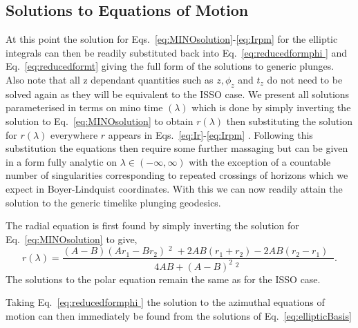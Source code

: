 \documentclass[12pt, amsmath]{revtex4-2}
\newcommand\lam{\lambda}
\DeclareMathOperator{\snr}{sin(\xi_r)}
\DeclareMathOperator{\cnr}{cos(\xi_r)}
\begin{document}
\subsection{Solutions to Equations of Motion}
At this point the solution for Eqs.~\eqref{eq:MINOsolution}-\eqref{eq:Irpm} for the elliptic integrals can then be readily substituted back into Eq.~\eqref{eq:reducedformphi } and  Eq.~\eqref{eq:reducedformt} giving the full form of the solutions to generic plunges. Also note that all z dependant quantities such as $z, \phi_z$ and $t_z$ do not need to be solved again as they will be equivalent to the ISSO case. We present all solutions parameterised in terms on mino time $(\lam)$ which is done by simply inverting the solution to Eq.~\eqref{eq:MINOsolution} to obtain $r(\lam)$ then substituting the solution for $r(\lam)$ everywhere $r$ appears in  Eqs.~\eqref{eq:Ir}-\eqref{eq:Irpm} . Following this substitution the equations then require some further massaging but can be given in a form fully analytic on $\lam \in (-\infty,\infty)$ with the exception of a countable number of singularities corresponding to repeated crossings of horizons which we expect in Boyer-Lindquist coordinates. With this we can now readily attain the solution to the generic timelike plunging geodesics.


The radial equation is first found by simply inverting the solution for Eq.~\eqref{eq:MINOsolution} to give,
\begin{equation}
r(\lam) = \frac{(A-B)(Ar_1-Br_2)\snr^2+2A B(r_1+r_2)-2AB(r_2-r_1)\cnr}{4 A B + (A-B)^2 \snr^2}.
\end{equation}
The solutions to the polar equation remain the same as for the ISSO case. 
    
Taking Eq.~\eqref{eq:reducedformphi } the solution  to the azimuthal equations of motion can then immediately be found from the solutions of Eq.~\eqref{eq:ellipticBasis}
\end{document}
